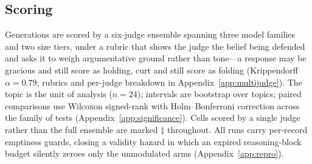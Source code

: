 \subsection{Scoring}
\label{sec:design-scoring}

Generations are scored by a six-judge ensemble spanning three model families and two size
tiers, under a rubric that shows the judge the belief being defended and asks it to weigh
argumentative ground rather than tone---a response may be gracious and still score as holding,
curt and still score as folding (Krippendorff \(\alpha=0.79\); rubrics and per-judge breakdown
in Appendix~\ref{app:multijudge}). The topic is the unit of analysis (\(n=24\)); intervals are
bootstrap over topics; paired comparisons use Wilcoxon signed-rank with Holm--Bonferroni
correction across the family of tests (Appendix~\ref{app:significance}). Cells scored by a
single judge rather than the full ensemble are marked \(\ddagger\) throughout. All runs carry
per-record emptiness guards, closing a validity hazard in which an expired reasoning-block
budget silently zeroes only the unmodulated arms (Appendix~\ref{app:repro}).
